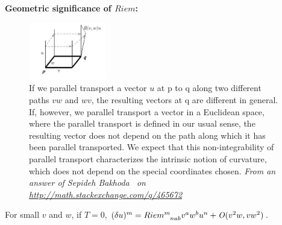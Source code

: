 \textbf{Geometric significance of $Riem$:} 
\begin{figure}
\label{fig:L8_Riem_Geometric_meaning}
  \centering
    \includegraphics[width=0.3\textwidth]{8_Riem_Geometric_meaning}
    \caption{If we parallel transport a vector $u$ at p to q along two different paths $vw$ and $wv$, the resulting vectors at q are different in general. If, however, we parallel transport a vector in a Euclidean space, where the parallel transport is defined in our usual sense, the resulting vector does not depend on the path along which it has been parallel transported. We expect that this non-integrability of parallel transport characterizes the intrinsic notion of curvature, which does not depend on the special coordinates chosen. \textit{From an answer of Sepideh Bakhoda~\cite{mse465672} on \url{http://math.stackexchange.com/q/465672}}}
\end{figure}

For small $v$ and $w$, if $T = 0$, $(\delta u)^m = Riem\indices{^m_{nab}} v^a w^b u^n + \mathit{O}(v^2w,vw^2)$.
